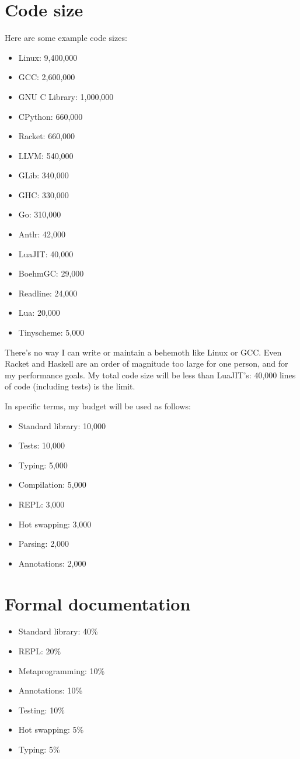 \section{Code size}

Here are some example code sizes:

\begin{itemize}
\item Linux:          9,400,000
\item GCC:            2,600,000
\item GNU C Library:  1,000,000
\item CPython:          660,000
\item Racket:           660,000
\item LLVM:             540,000
\item GLib:             340,000
\item GHC:              330,000
\item Go:               310,000
\item Antlr:             42,000
\item LuaJIT:            40,000
\item BoehmGC:           29,000
\item Readline:          24,000
\item Lua:               20,000
\item Tinyscheme:         5,000
\end{itemize}

There's no way I can write or maintain a behemoth like Linux or GCC.
Even Racket and Haskell are an order of magnitude too large for one
person, and for my performance goals. My total code size will be less
than LuaJIT's: 40,000 lines of code (including tests) is the limit.

In specific terms, my budget will be used as follows:

\begin{itemize}
\item Standard library:  10,000
\item Tests:             10,000
\item Typing:             5,000
\item Compilation:        5,000
\item REPL:               3,000
\item Hot swapping:       3,000
\item Parsing:            2,000
\item Annotations:        2,000
\end{itemize}


\section{Formal documentation}

\begin{itemize}
\item Standard library:  40\%
\item REPL:              20\%
\item Metaprogramming:   10\%
\item Annotations:       10\%
\item Testing:           10\%
\item Hot swapping:       5\%
\item Typing:             5\%
\end{itemize}
